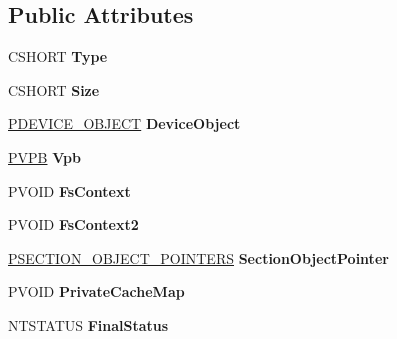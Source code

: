 \subsection*{Public Attributes}
\begin{DoxyCompactItemize}
\item 
\hypertarget{struct__FILE__OBJECT_acc46bfeaf2ac39b72d5960f15ed2188c}{}C\+S\+H\+O\+R\+T {\bfseries Type}\label{struct__FILE__OBJECT_acc46bfeaf2ac39b72d5960f15ed2188c}

\item 
\hypertarget{struct__FILE__OBJECT_a697edc1f8ac81a14aba365b54054addd}{}C\+S\+H\+O\+R\+T {\bfseries Size}\label{struct__FILE__OBJECT_a697edc1f8ac81a14aba365b54054addd}

\item 
\hypertarget{struct__FILE__OBJECT_a36b9fc7ca751328f86a831aa64456b2c}{}\hyperlink{struct__DEVICE__OBJECT}{P\+D\+E\+V\+I\+C\+E\+\_\+\+O\+B\+J\+E\+C\+T} {\bfseries Device\+Object}\label{struct__FILE__OBJECT_a36b9fc7ca751328f86a831aa64456b2c}

\item 
\hypertarget{struct__FILE__OBJECT_a36fcadc184eed42515bfcb19c26f7605}{}\hyperlink{struct__VPB}{P\+V\+P\+B} {\bfseries Vpb}\label{struct__FILE__OBJECT_a36fcadc184eed42515bfcb19c26f7605}

\item 
\hypertarget{struct__FILE__OBJECT_a1c09b9344307d9db0f233601cf807bc9}{}P\+V\+O\+I\+D {\bfseries Fs\+Context}\label{struct__FILE__OBJECT_a1c09b9344307d9db0f233601cf807bc9}

\item 
\hypertarget{struct__FILE__OBJECT_aa3ceb7332067ef3293439de6c46a3fa1}{}P\+V\+O\+I\+D {\bfseries Fs\+Context2}\label{struct__FILE__OBJECT_aa3ceb7332067ef3293439de6c46a3fa1}

\item 
\hypertarget{struct__FILE__OBJECT_af6be652e2703e11a8851952e4552d612}{}\hyperlink{struct__SECTION__OBJECT__POINTERS}{P\+S\+E\+C\+T\+I\+O\+N\+\_\+\+O\+B\+J\+E\+C\+T\+\_\+\+P\+O\+I\+N\+T\+E\+R\+S} {\bfseries Section\+Object\+Pointer}\label{struct__FILE__OBJECT_af6be652e2703e11a8851952e4552d612}

\item 
\hypertarget{struct__FILE__OBJECT_a03fadce048f0f6dd44d5f99e85b5200d}{}P\+V\+O\+I\+D {\bfseries Private\+Cache\+Map}\label{struct__FILE__OBJECT_a03fadce048f0f6dd44d5f99e85b5200d}

\item 
\hypertarget{struct__FILE__OBJECT_a91c810bb108a6103ef61678e2afcf3d1}{}N\+T\+S\+T\+A\+T\+U\+S {\bfseries Final\+Status}\label{struct__FILE__OBJECT_a91c810bb108a6103ef61678e2afcf3d1}


\end{DoxyCompactItemize}

